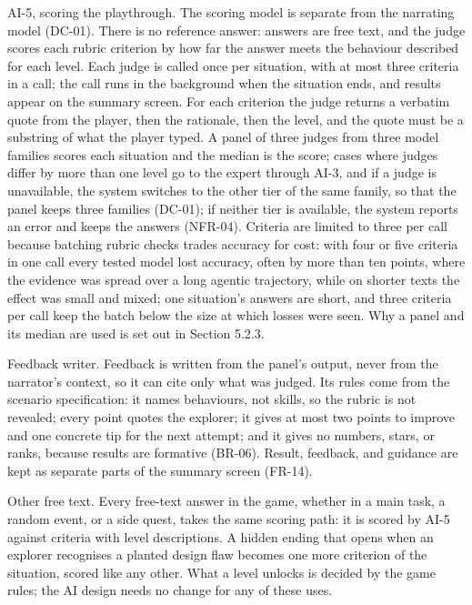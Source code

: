 AI-5, scoring the playthrough. The scoring model is separate from the narrating model (DC-01). There is no reference answer: answers are free text, and the judge scores each rubric criterion by how far the answer meets the behaviour described for each level. Each judge is called once per situation, with at most three criteria in a call; the call runs in the background when the situation ends, and results appear on the summary screen. For each criterion the judge returns a verbatim quote from the player, then the rationale, then the level, and the quote must be a substring of what the player typed. A panel of three judges from three model families scores each situation and the median is the score; cases where judges differ by more than one level go to the expert through AI-3, and if a judge is unavailable, the system switches to the other tier of the same family, so that the panel keeps three families (DC-01); if neither tier is available, the system reports an error and keeps the answers (NFR-04). Criteria are limited to three per call because batching rubric checks trades accuracy for cost: with four or five criteria in one call every tested model lost accuracy, often by more than ten points, where the evidence was spread over a long agentic trajectory, while on shorter texts the effect was small and mixed\cite{r122}; one situation's answers are short, and three criteria per call keep the batch below the size at which losses were seen. Why a panel and its median are used is set out in Section 5.2.3.

Feedback writer. Feedback is written from the panel's output, never from the narrator's context, so it can cite only what was judged. Its rules come from the scenario specification: it names behaviours, not skills, so the rubric is not revealed; every point quotes the explorer; it gives at most two points to improve and one concrete tip for the next attempt; and it gives no numbers, stars, or ranks, because results are formative (BR-06). Result, feedback, and guidance are kept as separate parts of the summary screen (FR-14).

Other free text. Every free-text answer in the game, whether in a main task, a random event, or a side quest, takes the same scoring path: it is scored by AI-5 against criteria with level descriptions. A hidden ending that opens when an explorer recognises a planted design flaw becomes one more criterion of the situation, scored like any other. What a level unlocks is decided by the game rules; the AI design needs no change for any of these uses.


